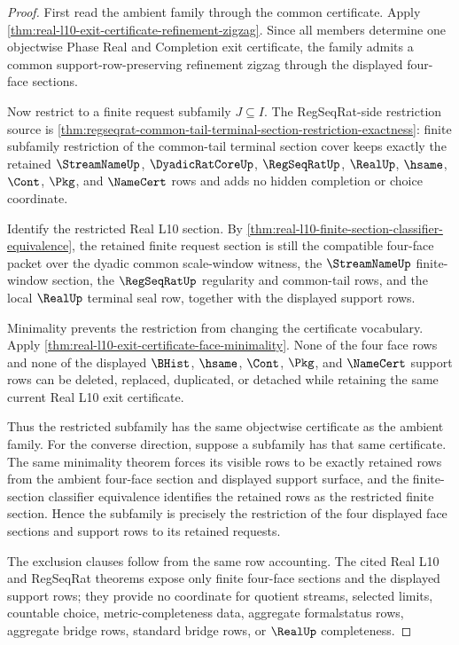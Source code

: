 \begin{proof}
First read the ambient family through the common certificate. Apply \autoref{thm:real-l10-exit-certificate-refinement-zigzag}. Since all members determine one objectwise Phase Real and Completion exit certificate, the family admits a common support-row-preserving refinement zigzag through the displayed four-face sections.

Now restrict to a finite request subfamily $J \subseteq I$. The RegSeqRat-side restriction source is \autoref{thm:regseqrat-common-tail-terminal-section-restriction-exactness}: finite subfamily restriction of the common-tail terminal section cover keeps exactly the retained $\StreamNameUp$, $\DyadicRatCoreUp$, $\RegSeqRatUp$, $\RealUp$, $\hsame$, $\Cont$, $\Pkg$, and $\NameCert$ rows and adds no hidden completion or choice coordinate.

Identify the restricted Real L10 section. By \autoref{thm:real-l10-finite-section-classifier-equivalence}, the retained finite request section is still the compatible four-face packet over the dyadic common scale-window witness, the $\StreamNameUp$ finite-window section, the $\RegSeqRatUp$ regularity and common-tail rows, and the local $\RealUp$ terminal seal row, together with the displayed support rows.

Minimality prevents the restriction from changing the certificate vocabulary. Apply \autoref{thm:real-l10-exit-certificate-face-minimality}. None of the four face rows and none of the displayed $\BHist$, $\hsame$, $\Cont$, $\Pkg$, and $\NameCert$ support rows can be deleted, replaced, duplicated, or detached while retaining the same current Real L10 exit certificate.

Thus the restricted subfamily has the same objectwise certificate as the ambient family. For the converse direction, suppose a subfamily has that same certificate. The same minimality theorem forces its visible rows to be exactly retained rows from the ambient four-face section and displayed support surface, and the finite-section classifier equivalence identifies the retained rows as the restricted finite section. Hence the subfamily is precisely the restriction of the four displayed face sections and support rows to its retained requests.

The exclusion clauses follow from the same row accounting. The cited Real L10 and RegSeqRat theorems expose only finite four-face sections and the displayed support rows; they provide no coordinate for quotient streams, selected limits, countable choice, metric-completeness data, aggregate formalstatus rows, aggregate bridge rows, standard bridge rows, or $\RealUp$ completeness.
\end{proof}

